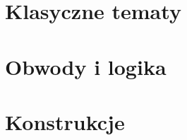 \documentclass[11pt,twoside]{book}
\begin{document}
\pagestyle{fancy} %


\renewcommand{\chaptermark}[1]{\markboth{\sffamily\normalsize\bfseries Spis treści}{}} %





\mainmatter


\renewcommand{\chaptermark}[1]{\markboth{\sffamily\normalsize\bfseries\chaptername\ \thechapter.\ #1}{}} %



\part{Klasyczne tematy}













\part{Obwody i logika}












\part{Konstrukcje}
\end{document}

